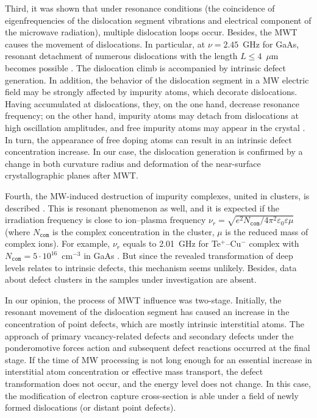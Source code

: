 \documentclass[10pt]{iopart}
\begin{document}
Third, it was shown \cite{MWT:JLumin,Konakova2007JTFEn,Milenin:SPQEO2019} that under resonance conditions
(the coincidence of eigenfrequencies of the dislocation segment vibrations and electrical component of the microwave radiation),
multiple dislocation loops occur.
Besides, the MWT causes the  movement of dislocations.
In particular, at $\nu=2.45$~GHz for GaAs, resonant detachment
of numerous dislocations with the length $L\leq4$~$\mu$m becomes possible \cite{Milenin:SPQEO2019}.
The dislocation climb is accompanied by intrinsic defect generation.
In addition, the behavior of the dislocation segment in a MW electric field may be strongly affected by
impurity atoms, which decorate dislocations.
Having accumulated at dislocations, they, on the one hand,
decrease resonance frequency;
on the other hand, impurity atoms may detach from dislocations at
high oscillation amplitudes, and free impurity atoms may appear in the crystal \cite{MWT:JLumin,Konakova2007JTFEn}.
In turn, the appearance of free doping atoms can result in an intrinsic defect concentration increase.
In our case, the dislocation generation is confirmed by a change in both curvature radius and
deformation of the near-surface crystallographic planes after MWT.

Fourth, the MW-induced destruction of impurity complexes, united in clusters,
is described \cite{MWT:JLumin,Konakova2007JTFEn,Milenin:SPQEO2019}.
This is resonant phenomenon as well, and it is expected if the
irradiation frequency is close to ion--plasma frequency
$\nu_r=\sqrt{e^2N_\mathtt{com}/4\pi^2\varepsilon_0\varepsilon\mu}$
(where
$N_\mathtt{com}$ is the complex concentration in the cluster,
$\mu$ is the reduced mass of complex ions).
For example, $\nu_r$ equals to 2.01~GHz for
Te$^+$--Cu$^-$ complex with $N_\mathtt{com}=5\cdot10^{16}$~cm$^{-3}$
in GaAs \cite{MWT:JLumin}.
But since the revealed transformation of deep levels
relates to intrinsic defects, this mechanism seems unlikely.
Besides, data about defect clusters in the samples under investigation are absent.

In our opinion, the process of MWT influence was two-stage.
Initially, the resonant movement of the dislocation segment
has caused an increase in the concentration of point defects, which are mostly intrinsic interstitial atoms.
The approach of primary vacancy-related defects and secondary defects under
the ponderomotive forces action and subsequent defect reactions occurred at the final stage.
If the time of MW processing is not long enough for an essential increase in interstitial atom concentration or effective mass transport,
the defect transformation does not occur, and the energy level does not change.
In this case, the modification of electron capture cross-section is able under a
field of newly formed dislocations  (or distant point defects).
\end{document}
